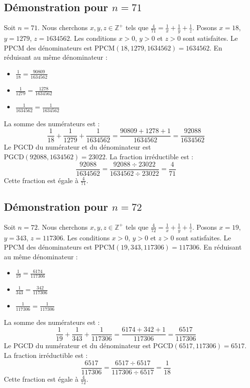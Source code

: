 \documentclass[11pt,a4paper]{article}
\begin{document}
\subsection{Démonstration pour $n = 71$}
Soit $n = 71$. Nous cherchons $x, y, z \in \mathbb{Z}^{+}$ tels que $\frac{4}{71} = \frac{1}{x} + \frac{1}{y} + \frac{1}{z}$.
Posons $x = 18$, $y = 1279$, $z = 1634562$.
Les conditions $x > 0$, $y > 0$ et $z > 0$ sont satisfaites.
Le PPCM des dénominateurs est $\text{PPCM}(18, 1279, 1634562) = 1634562$.
En réduisant au même dénominateur :
\begin{itemize}
    \item $\frac{1}{18} = \frac{90809}{1634562}$
    \item $\frac{1}{1279} = \frac{1278}{1634562}$
    \item $\frac{1}{1634562} = \frac{1}{1634562}$
\end{itemize}
La somme des numérateurs est :
$$ \frac{1}{18} + \frac{1}{1279} + \frac{1}{1634562} = \frac{90809 + 1278 + 1}{1634562} = \frac{92088}{1634562} $$
Le PGCD du numérateur et du dénominateur est $\text{PGCD}(92088, 1634562) = 23022$.
La fraction irréductible est :
$$ \frac{92088}{1634562} = \frac{92088 \div 23022}{1634562 \div 23022} = \frac{4}{71} $$
Cette fraction est égale à $\frac{4}{71}$.

\subsection{Démonstration pour $n = 72$}
Soit $n = 72$. Nous cherchons $x, y, z \in \mathbb{Z}^{+}$ tels que $\frac{4}{72} = \frac{1}{x} + \frac{1}{y} + \frac{1}{z}$.
Posons $x = 19$, $y = 343$, $z = 117306$.
Les conditions $x > 0$, $y > 0$ et $z > 0$ sont satisfaites.
Le PPCM des dénominateurs est $\text{PPCM}(19, 343, 117306) = 117306$.
En réduisant au même dénominateur :
\begin{itemize}
    \item $\frac{1}{19} = \frac{6174}{117306}$
    \item $\frac{1}{343} = \frac{342}{117306}$
    \item $\frac{1}{117306} = \frac{1}{117306}$
\end{itemize}
La somme des numérateurs est :
$$ \frac{1}{19} + \frac{1}{343} + \frac{1}{117306} = \frac{6174 + 342 + 1}{117306} = \frac{6517}{117306} $$
Le PGCD du numérateur et du dénominateur est $\text{PGCD}(6517, 117306) = 6517$.
La fraction irréductible est :
$$ \frac{6517}{117306} = \frac{6517 \div 6517}{117306 \div 6517} = \frac{1}{18} $$
Cette fraction est égale à $\frac{4}{72}$.
\end{document}
